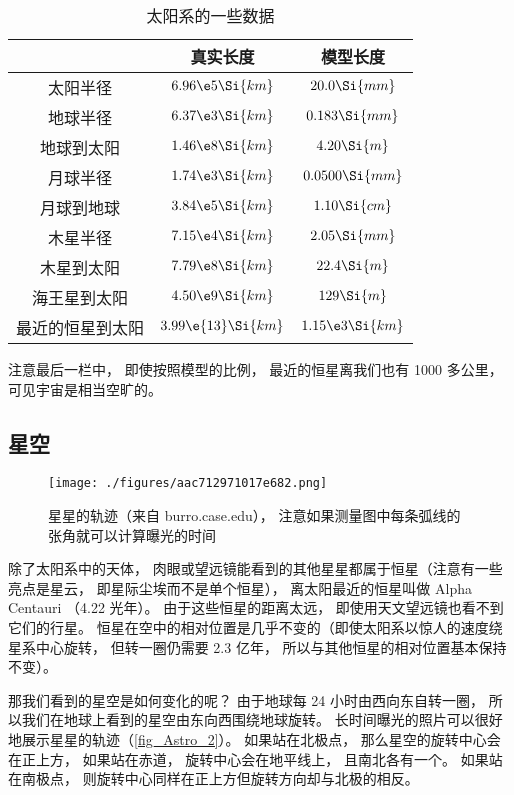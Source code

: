 \begin{table}[ht]
\centering
\caption{太阳系的一些数据}\label{tab_Astro_1}
\begin{tabular}{|c|c|c|}
\hline
 & 真实长度 & 模型长度 \\
\hline
太阳半径 & $6.96\e5 \Si{km}$ & $20.0 \Si{mm}$\\
\hline
地球半径 &  $6.37\e3 \Si{km}$ & $0.183 \Si{mm}$\\
\hline
地球到太阳  &  $1.46\e8 \Si{km}$ & $4.20 \Si{m}$\\
\hline
月球半径 & $1.74\e3 \Si{km}$ & $0.0500 \Si{mm}$\\
\hline
月球到地球 & $3.84\e5 \Si{km}$ &  $1.10 \Si{cm}$\\
\hline
木星半径 & $7.15\e4 \Si{km}$ & $2.05 \Si{mm}$\\
\hline
木星到太阳 & $7.79\e8 \Si{km}$ & $22.4 \Si{m}$\\
\hline
海王星到太阳 & $4.50\e9 \Si{km}$ & $129 \Si{m}$\\
\hline
最近的恒星到太阳 & $3.99\e{13} \Si{km}$ &  $1.15\e3 \Si{km}$\\
\hline
\end{tabular}
\end{table}
注意最后一栏中， 即使按照模型的比例， 最近的恒星离我们也有 1000 多公里， 可见宇宙是相当空旷的。

\subsection{星空}

\begin{figure}[ht]
\centering
\texttt{[image: ./figures/aac712971017e682.png]}
\caption{星星的轨迹（来自 burro.case.edu）， 注意如果测量图中每条弧线的张角就可以计算曝光的时间} \label{fig_Astro_2}
\end{figure}

除了太阳系中的天体， 肉眼或望远镜能看到的其他星星都属于恒星（注意有一些亮点是星云， 即星际尘埃而不是单个恒星）， 离太阳最近的恒星叫做 Alpha Centauri （4.22 光年）。 由于这些恒星的距离太远， 即使用天文望远镜也看不到它们的行星。 恒星在空中的相对位置是几乎不变的（即使太阳系以惊人的速度绕星系中心旋转， 但转一圈仍需要 2.3 亿年， 所以与其他恒星的相对位置基本保持不变）。

那我们看到的星空是如何变化的呢？ 由于地球每 24 小时由西向东自转一圈， 所以我们在地球上看到的星空由东向西围绕地球旋转。 长时间曝光的照片可以很好地展示星星的轨迹（\autoref{fig_Astro_2}）。 如果站在北极点， 那么星空的旋转中心会在正上方， 如果站在赤道， 旋转中心会在地平线上， 且南北各有一个。 如果站在南极点， 则旋转中心同样在正上方但旋转方向却与北极的相反。

